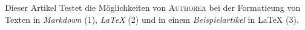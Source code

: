 Dieser Artikel Testet die Möglichkeiten von \textsc{Authorea} bei der Formatieung von Texten in \emph{Markdown} (1), \emph{LaTeX} (2) und in einem \textit{Beispielartikel} in LaTeX (3).
